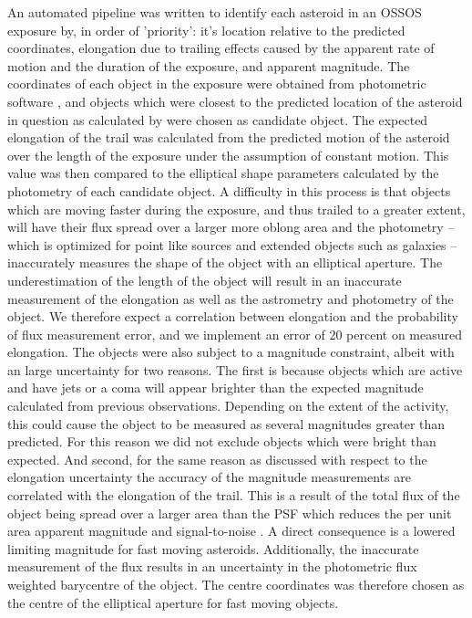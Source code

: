 \documentclass[iop,apj]{emulateapj}
\begin{document}
An automated pipeline was written to identify each asteroid in an OSSOS exposure by, in order of 'priority': it's location relative to the predicted coordinates,  elongation due to trailing effects caused by the apparent rate of motion and the duration of the exposure, and apparent magnitude. 
The coordinates of each object in the exposure were obtained from photometric software \citep{sep}, and objects which were closest to the predicted location of the asteroid in question as calculated by \cite{jpl} were chosen as candidate object. 
The expected elongation of the trail was calculated from the predicted motion of the asteroid over the length of the exposure \citep{jpl} under the assumption of constant motion. This value was then compared to the elliptical shape parameters calculated by the photometry of each candidate object. 
A difficulty in this process is that objects which are moving faster during the exposure, and thus trailed to a greater extent, will have their flux spread over a larger more oblong area and the photometry -- which is optimized for point like sources and extended objects such as galaxies --  inaccurately measures the shape of the object with an elliptical aperture. The underestimation of the length of the object will result in an inaccurate measurement of the elongation as well as the astrometry and photometry of the object. We  therefore expect a correlation between elongation and the probability of flux measurement error, and we implement an error of 20 percent on measured elongation.  
The objects were also subject to a magnitude constraint, albeit with an large uncertainty for two reasons. The first is because objects which are active and have jets or a coma will appear brighter than the expected magnitude calculated from previous observations. Depending on the extent of the activity, this could cause the object to be measured as several magnitudes greater than predicted. For this reason we did not exclude objects which were bright than expected.  
And second, for the same reason as discussed with respect to the elongation uncertainty the accuracy of the magnitude measurements are correlated with the elongation of the trail. This is a result of the total flux of the object being spread over a larger area than the PSF which reduces the per unit area apparent magnitude and signal-to-noise \citep{veres12}. A direct consequence is a lowered limiting magnitude for fast moving asteroids. Additionally, the inaccurate measurement of the flux results in an uncertainty in the photometric flux weighted barycentre of the object. The centre coordinates was therefore chosen as the centre of the elliptical aperture for fast moving objects.
\end{document}
